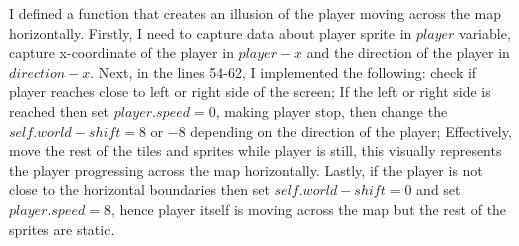 \documentclass[12pt]{article}
\begin{document}
I defined a function that creates an illusion of the player moving across the map horizontally. Firstly, I need to capture data about player sprite in $player$ variable, capture x-coordinate of the player in $player-x$ and the direction of the player in $direction-x$.
Next, in the lines 54-62, I implemented the following: check if player reaches close to left or right side of the screen; If the left or right side is reached then set $player.speed = 0$, making player stop, then change the $self.world-shift =8$ or $-8$ depending on the direction of the player; Effectively, move the rest of the tiles and sprites while player is still, this visually represents the player progressing across the map horizontally. Lastly, if the player is not close to the horizontal boundaries then set $self.world-shift = 0$ and set $player.speed = 8$, hence player itself is moving across the map but the rest of the sprites are static.\\
\end{document}

